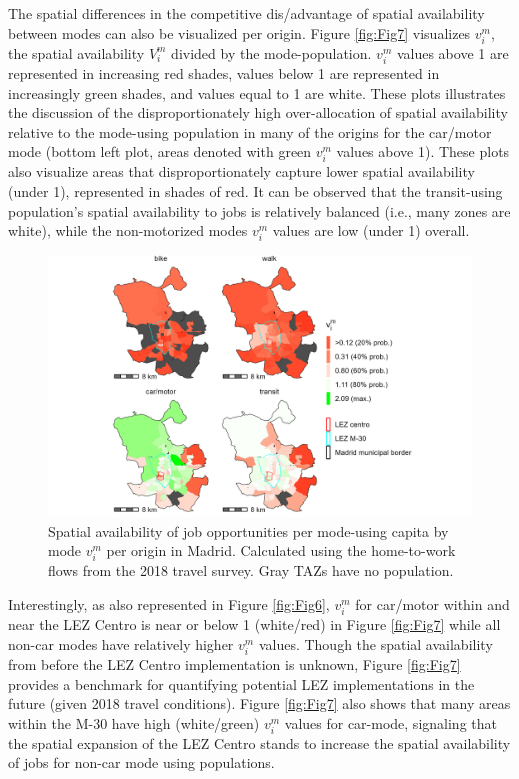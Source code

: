 \documentclass[10pt,letterpaper]{article}
\begin{document}
The spatial differences in the competitive dis/advantage of spatial
availability between modes can also be visualized per origin. Figure
\ref{fig:Fig7} visualizes \(v_i^m\), the spatial availability \(V_i^m\)
divided by the mode-population. \(v_i^m\) values above 1 are represented
in increasing red shades, values below 1 are represented in increasingly
green shades, and values equal to 1 are white. These plots illustrates
the discussion of the disproportionately high over-allocation of spatial
availability relative to the mode-using population in many of the
origins for the car/motor mode (bottom left plot, areas denoted with
green \(v_i^m\) values above 1). These plots also visualize areas that
disproportionately capture lower spatial availability (under 1),
represented in shades of red. It can be observed that the transit-using
population's spatial availability to jobs is relatively balanced (i.e.,
many zones are white), while the non-motorized modes \(v_i^m\) values
are low (under 1) overall.

\begin{figure}

{\centering \includegraphics[width=1\linewidth]{images/SA_im_vv_zn208_plot} 

}

\caption{\label{fig:Fig7} Spatial availability of job opportunities per mode-using capita by mode $v_i^m$ per origin in Madrid. Calculated using the home-to-work flows from the 2018 travel survey. Gray TAZs have no population.}\label{fig:SA-per-capita-m-plot}
\end{figure}

Interestingly, as also represented in Figure \ref{fig:Fig6}, \(v_i^m\)
for car/motor within and near the LEZ Centro is near or below 1
(white/red) in Figure \ref{fig:Fig7} while all non-car modes have
relatively higher \(v_i^m\) values. Though the spatial availability from
before the LEZ Centro implementation is unknown, Figure \ref{fig:Fig7}
provides a benchmark for quantifying potential LEZ implementations in
the future (given 2018 travel conditions). Figure \ref{fig:Fig7} also
shows that many areas within the M-30 have high (white/green) \(v_i^m\)
values for car-mode, signaling that the spatial expansion of the LEZ
Centro stands to increase the spatial availability of jobs for non-car
mode using populations.
\end{document}
